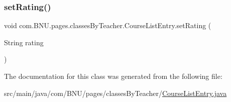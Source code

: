 \subsubsection{\texorpdfstring{set\+Rating()}{setRating()}}
{\footnotesize\ttfamily void com.\+B\+N\+U.\+pages.\+classes\+By\+Teacher.\+Course\+List\+Entry.\+set\+Rating (\begin{DoxyParamCaption}\item[{String}]{rating }\end{DoxyParamCaption})}



The documentation for this class was generated from the following file\+:\begin{DoxyCompactItemize}
\item 
src/main/java/com/\+B\+N\+U/pages/classes\+By\+Teacher/\mbox{\hyperlink{_course_list_entry_8java}{Course\+List\+Entry.\+java}}\end{DoxyCompactItemize}
